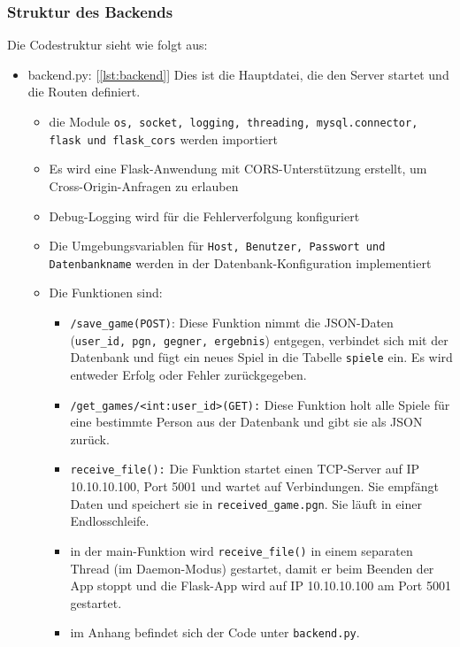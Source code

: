 \subsubsection{Struktur des Backends}
Die Codestruktur sieht wie folgt aus:
\begin{itemize}
    \item backend.py: [\ref{lst:backend}] Dies ist die Hauptdatei, die den Server startet und die 
    Routen definiert. 
    \begin{itemize}
        \item die Module \texttt{os, socket, logging, threading, mysql.connector, flask und 
        flask\_cors} werden importiert
        \item Es wird eine Flask-Anwendung mit CORS-Unterstützung erstellt, um 
        Cross-Origin-Anfragen zu erlauben
        \item Debug-Logging wird für die Fehlerverfolgung konfiguriert
        \item Die Umgebungsvariablen für \texttt{Host, Benutzer, Passwort und Datenbankname} 
        werden in der Datenbank-Konfiguration implementiert
        \item Die Funktionen sind:
        \begin{itemize}
            \item \texttt{/save\_game(POST)}: Diese Funktion nimmt die JSON-Daten 
            (\texttt{user\_id, pgn, gegner, ergebnis}) entgegen, verbindet sich mit der 
            Datenbank und fügt ein neues Spiel in die Tabelle \texttt{spiele} ein. Es wird 
            entweder Erfolg oder Fehler zurückgegeben.
            \item \texttt{/get\_games/<int:user\_id>(GET):} Diese Funktion holt alle Spiele 
            für eine bestimmte Person aus der Datenbank und gibt sie als JSON zurück. 
            \item \texttt{receive\_file():} Die Funktion startet einen TCP-Server auf 
            IP 10.10.10.100, Port 5001 und wartet auf Verbindungen. Sie empfängt Daten und 
            speichert sie in \texttt{received\_game.pgn}. Sie läuft in einer Endlosschleife. 
            \item in der main-Funktion wird \texttt{receive\_file()} in einem separaten Thread 
            (im Daemon-Modus) gestartet, damit er beim Beenden der App stoppt und die Flask-App 
            wird auf IP 10.10.10.100 am Port 5001 gestartet. 
            \item im Anhang befindet sich der Code unter \texttt{backend.py}.
        \end{itemize}
    \end{itemize}


\end{itemize}
